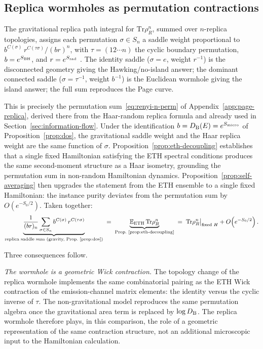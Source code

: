 \documentclass[12pt]{article}
\newcommand{\Tr}{\mathrm{Tr}}
\newcommand{\E}{\mathbb E}
\newcommand{\Smicro}{S_{\rm micro}}
\begin{document}
\subsection{Replica wormholes as permutation contractions}
\label{sec:wormhole-ETH}

The gravitational replica path integral for $\Tr\rho_R^n$, summed over
$n$-replica topologies, assigns each permutation $\sigma\in S_n$ a saddle
weight proportional to $b^{C(\sigma)}\,r^{C(\tau\sigma)}/(br)^n$, with
$\tau=(12\cdots n)$ the cyclic boundary permutation, $b=e^{S_{\rm BH}}$,
and $r=e^{S_{\rm rad}}$
\cite{PeningtonShenkerStanfordYang2022,AlmheiriHartmanMaldacenaShaghoulianTajdini2020}.
The identity saddle ($\sigma=e$, weight $r^{-1}$) is the disconnected
geometry giving the Hawking/no-island answer; the dominant connected saddle
($\sigma=\tau^{-1}$, weight $b^{-1}$) is the Euclidean wormhole giving the
island answer; the full sum reproduces the Page curve.

This is precisely the permutation sum~\eqref{eq:renyi-n-perm} of
Appendix~\ref{app:page-replica}, derived there from the Haar-random replica
formula and already used in Section~\ref{sec:information-flow}.
Under the identification $b=D_{\rm B}(E)=e^{\Smicro}$ of
Proposition~\ref{prop:dos}, the gravitational saddle weight and the
Haar replica weight are the same function of $\sigma$.
Proposition~\ref{prop:eth-decoupling} establishes that a single fixed
Hamiltonian satisfying the ETH spectral conditions produces the same
second-moment structure as a Haar isometry, grounding the permutation sum
in non-random Hamiltonian dynamics.
Proposition~\ref{prop:self-averaging} then upgrades the statement from the
ETH ensemble to a single fixed Hamiltonian: the instance purity deviates from
the permutation sum by $O(e^{-S_0/2})$.
Taken together:
\begin{equation}
  \label{eq:wormhole-ETH-chain}
  \underbrace{
    \frac{1}{(br)_n}
    \sum_{\sigma\in S_n}
    b^{C(\sigma)}\,r^{C(\tau\sigma)}
  }_{\text{replica saddle sum (gravity, Prop.~\ref{prop:dos})}}
  \;=\;
  \underbrace{\E_{\rm ETH}\,\Tr\rho_R^n}_{\text{Prop.~\ref{prop:eth-decoupling}}}
  \;=\;
  \Tr\rho_R^n\big|_{\text{fixed }H}+O\!\left(e^{-S_0/2}\right).
\end{equation}

Three consequences follow.

\smallskip\noindent\emph{The wormhole is a geometric Wick contraction.}
The topology change of the replica wormhole implements the same combinatorial
pairing as the ETH Wick contraction of the emission-channel matrix elements:
the identity versus the cyclic inverse of $\tau$.  The non-gravitational
model reproduces the same permutation algebra once the gravitational area
term is replaced by $\log D_{\rm B}$.  The replica wormhole therefore plays,
in this comparison, the role of a geometric representation of the same
contraction structure, not an additional microscopic input to the
Hamiltonian calculation.
\end{document}
